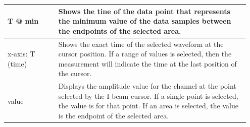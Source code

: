 \documentclass{article}
\begin{document}
\begin{table}[t!]
\begin{tabular}[t!]{p{0.2\linewidth}p{0.75\linewidth}}
\midrule
T @ min & Shows the tine of the data point that represents the minimum value of the data samples between the endpoints of the selected area.\\
\midrule
x-axis: T (time) & Shows the exact time of the selected waveform at the cursor position. If a range of values is selected, then the measurement will indicate the time at the last position of the cursor.\\
\midrule
value & Displays the amplitude value for the channel at the point selected by the I-beam cursor. If a single point is selected, the value is for that point. If an area is selected, the value is the endpoint of the selected area.\\
\bottomrule
\end{tabular}
\end{table}
\end{document}
